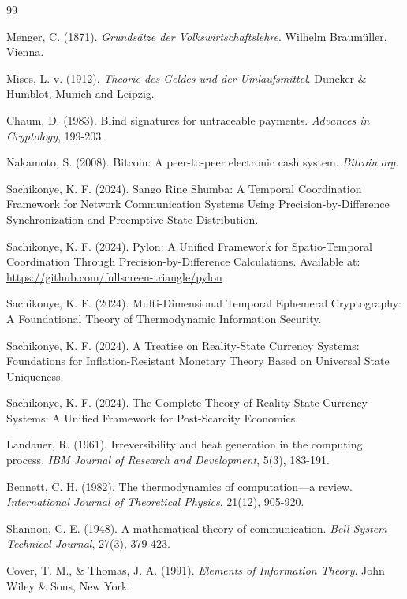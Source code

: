 \documentclass[12pt,a4paper]{article}
\begin{document}

\begin{thebibliography}{99}

 Menger, C. (1871). \textit{Grundsätze der Volkswirtschaftslehre}. Wilhelm Braumüller, Vienna.

 Mises, L. v. (1912). \textit{Theorie des Geldes und der Umlaufsmittel}. Duncker \& Humblot, Munich and Leipzig.

 Chaum, D. (1983). Blind signatures for untraceable payments. \textit{Advances in Cryptology}, 199-203.

 Nakamoto, S. (2008). Bitcoin: A peer-to-peer electronic cash system. \textit{Bitcoin.org}.

 Sachikonye, K. F. (2024). Sango Rine Shumba: A Temporal Coordination Framework for Network Communication Systems Using Precision-by-Difference Synchronization and Preemptive State Distribution.

 Sachikonye, K. F. (2024). Pylon: A Unified Framework for Spatio-Temporal Coordination Through Precision-by-Difference Calculations. Available at: \url{https://github.com/fullscreen-triangle/pylon}

 Sachikonye, K. F. (2024). Multi-Dimensional Temporal Ephemeral Cryptography: A Foundational Theory of Thermodynamic Information Security.

 Sachikonye, K. F. (2024). A Treatise on Reality-State Currency Systems: Foundations for Inflation-Resistant Monetary Theory Based on Universal State Uniqueness.

 Sachikonye, K. F. (2024). The Complete Theory of Reality-State Currency Systems: A Unified Framework for Post-Scarcity Economics.

 Landauer, R. (1961). Irreversibility and heat generation in the computing process. \textit{IBM Journal of Research and Development}, 5(3), 183-191.

 Bennett, C. H. (1982). The thermodynamics of computation—a review. \textit{International Journal of Theoretical Physics}, 21(12), 905-920.

 Shannon, C. E. (1948). A mathematical theory of communication. \textit{Bell System Technical Journal}, 27(3), 379-423.

 Cover, T. M., \& Thomas, J. A. (1991). \textit{Elements of Information Theory}. John Wiley \& Sons, New York.

\end{thebibliography}
\end{document}
